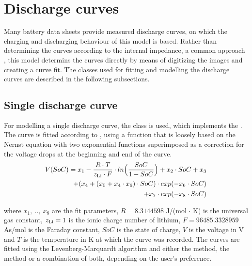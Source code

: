 \section{Discharge curves}
\label{sec:dischargeCurvesMain}
Many battery data sheets provide measured discharge curves, on which the charging and discharging behaviour of this model is based. Rather than determining the curves according to the internal impedance, a common approach \cite{lijun_gao_dynamic_2002}, this model determins the curves directly by means of digitizing the images and creating a curve fit. The classes used for fitting and modelling the discharge curves are described in the following subsections.

\subsection{Single discharge curve}
\label{sec:dischargeFit}
For modelling a single discharge curve, the class  is used, which implements the . The curve is fitted according to \cite{werder_entwicklung_2014}, using a function that is loosely based on the Nernst equation with two exponential functions superimposed as a correction for the voltage drops at the beginning and end of the curve.
\begin{equation}
\begin{aligned}
V(SoC) = x_1 - \frac{R\cdot T}{z_\text{Li}\cdot F}\cdot ln\Big(\frac{SoC}{1-SoC}\Big)
+ x_2\cdot SoC + x_3 \\
+ (x_4 + (x_5 + x_4\cdot x_6)\cdot SoC)\cdot exp(-x_6\cdot SoC) \\
+ x_7\cdot exp(-x_8\cdot SoC)
\end{aligned}
\end{equation}

where $x_1,\ ..,\ x_8$ are the fit parameters, $R = 8.3144598$ J/(mol $\cdot$ K) is the universal gas constant, $z_\text{Li} = 1$ is the ionic charge number of lithium, $F = 96485.3328959$ As/mol is the Faraday constant, $SoC$ is the state of charge, $V$ is the voltage in V and $T$ is the temperature in K at which the curve was recorded. The curves are fitted using the Levenberg-Marquardt algorithm and either the  method, the  method or a combination of both, depending on the user's preference. 

